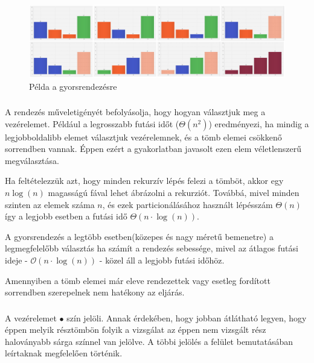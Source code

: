 \documentclass{elteikthesis}
\newcommand{\hiddensubsubsection}[1]{
	\stepcounter{subsubsection}
	\subsubsection*{\hspace{1em}{#1}}
}
\begin{document}
 \begin{figure}[H]
 	\centering
 	\includegraphics[width=1\textwidth]{pics/quick.jpg}
 	\caption{Példa a gyorsrendezésre}
 \end{figure}\par
\hiddensubsubsection{Műveletigény}
A rendezés műveletigényét befolyásolja, hogy hogyan választjuk meg a vezérelemet. Például a legrosszabb futási időt ($\Theta(n^2)$) eredményezi, ha mindig a legjobboldalibb elemet választjuk vezérelemnek, és a tömb elemei csökkenő sorrendben vannak\cite{Cormen}. Éppen ezért a gyakorlatban javasolt ezen elem véletlenszerű megválasztása.\par
Ha feltételezzük azt, hogy minden rekurzív lépés felezi a tömböt, akkor egy $n\log(n)$ magasságú fával lehet ábrázolni a rekurziót. Továbbá, mivel minden szinten az elemek száma $n$, és ezek particionálásához használt lépésszám $\Theta(n)$ így a legjobb esetben a futási idő $\Theta(n\cdot\log(n))$.\par
 A gyorsrendezés a legtöbb esetben(közepes és nagy méretű bemenetre) a legmegfelelőbb választás ha számít a rendezés sebessége, mivel az átlagos futási ideje - $\mathcal{O}(n\cdot\log(n))$ - közel áll a legjobb futási időhöz\cite{Cormen}.\par
 Amennyiben a tömb elemei már eleve rendezettek vagy esetleg fordított sorrendben szerepelnek nem hatékony az eljárás.
\hiddensubsubsection{Jelölések az állapotjelző felületen}
A vezérelemet \textcolor{select}{\Huge$\bullet$} szín jelöli. Annak érdekében, hogy jobban átlátható legyen, hogy éppen melyik résztömbön folyik a vizsgálat az éppen nem vizsgált rész haloványabb sárga színnel van jelölve. A többi jelölés a felület bemutatásában leírtaknak megfelelően történik.
\end{document}

